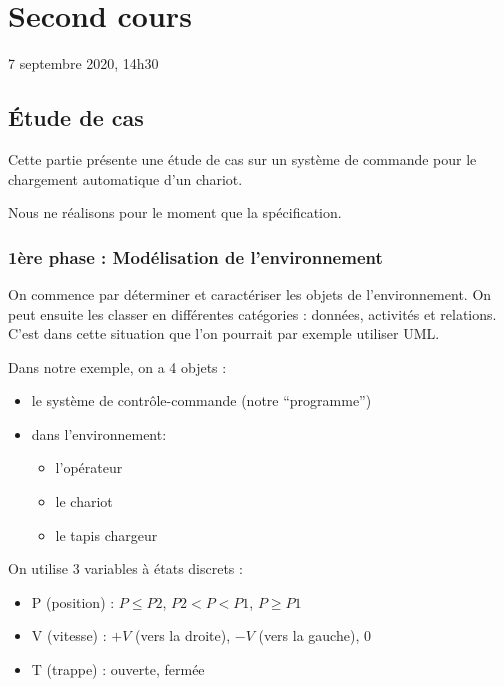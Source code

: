 \section{Second cours}

7 septembre 2020, 14h30

\hypertarget{uxe9tude-de-cas}{%
\subsection{Étude de cas}\label{uxe9tude-de-cas}}

Cette partie présente une étude de cas sur un système de commande pour
le chargement automatique d'un chariot.

Nous ne réalisons pour le moment que la spécification.

\hypertarget{uxe8re-phase-moduxe9lisation-de-lenvironnement}{%
\subsubsection{1ère phase : Modélisation de
l'environnement}\label{uxe8re-phase-moduxe9lisation-de-lenvironnement}}

On commence par déterminer et caractériser les objets de
l'environnement. On peut ensuite les classer en différentes catégories :
données, activités et relations. C'est dans cette situation que l'on
pourrait par exemple utiliser UML.

Dans notre exemple, on a 4 objets :

\begin{itemize}
\tightlist
\item
  le système de contrôle-commande (notre ``programme'')
\item
  dans l'environnement:

  \begin{itemize}
  \tightlist
  \item
    l'opérateur
  \item
    le chariot
  \item
    le tapis chargeur
  \end{itemize}
\end{itemize}

On utilise 3 variables à états discrets :

\begin{itemize}
\tightlist
\item
  P (position) : \(P \leqslant P2\), \(P2 < P < P1\),
  \(P \geqslant P1\)
\item
  V (vitesse) : \(+V\) (vers la droite), \(-V\) (vers la gauche), 0
\item
  T (trappe) : ouverte, fermée
\end{itemize}


